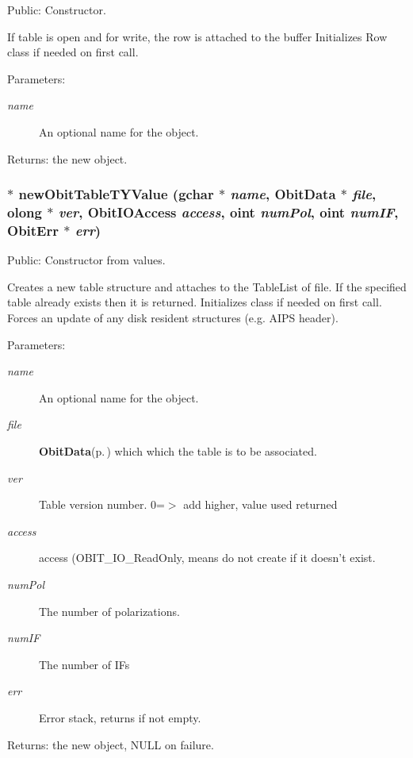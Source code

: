 Public: Constructor. 

If table is open and for write, the row is attached to the buffer Initializes Row class if needed on first call. \begin{Desc}
\item[Parameters:]
\begin{description}
\item[{\em name}]An optional name for the object. \end{description}
\end{Desc}
\begin{Desc}
\item[Returns:]the new object. \end{Desc}
\subsubsection{$\ast$ new\-Obit\-Table\-TYValue (gchar $\ast$ {\em name}, {\bf Obit\-Data} $\ast$ {\em file}, {\bf olong} $\ast$ {\em ver}, Obit\-IOAccess {\em access}, {\bf oint} {\em num\-Pol}, {\bf oint} {\em num\-IF}, {\bf Obit\-Err} $\ast$ {\em err})}\label{ObitTableTY_8h_a12}


Public: Constructor from values. 

Creates a new table structure and attaches to the Table\-List of file. If the specified table already exists then it is returned. Initializes class if needed on first call. Forces an update of any disk resident structures (e.g. AIPS header). \begin{Desc}
\item[Parameters:]
\begin{description}
\item[{\em name}]An optional name for the object. \item[{\em file}]{\bf Obit\-Data}{\rm (p.\,\pageref{structObitData})} which which the table is to be associated. \item[{\em ver}]Table version number. 0=$>$ add higher, value used returned \item[{\em access}]access (OBIT\_\-IO\_\-Read\-Only, means do not create if it doesn't exist. \item[{\em num\-Pol}]The number of polarizations. \item[{\em num\-IF}]The number of IFs \item[{\em err}]Error stack, returns if not empty. \end{description}
\end{Desc}
\begin{Desc}
\item[Returns:]the new object, NULL on failure. \end{Desc}

